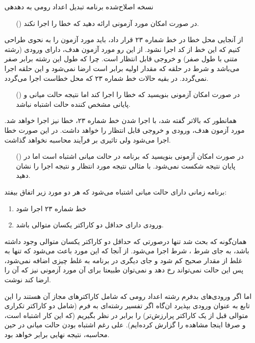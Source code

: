 \documentclass[twoside]{article}
\newenvironment{answer}{}{\medskip}
\newenvironment{qitem}[1]{%
	\begin{enumerate}\item[(\lr{#1})]}{\end{enumerate}}
\begin{document}
\begin{listing}[h]
\caption{نسخه اصلاح‌شده برنامه تبدیل اعداد رومی به دهدهی}
\label{code:convert}
\end{listing}
\begin{qitem}{b}
در صورت امکان مورد آزمونی ارائه دهید که خطا را اجرا نکند.
\end{qitem}
\begin{answer}
از آنجایی محل خطا در خط شماره ۲۳ قرار داد، باید مورد آزمون را به نحوی طراحی کنیم که این خط از کد اجرا نشود. از این رو مورد آزمون هدف، دارای ورودی  (رشته متنی با طول صفر) و خروجی قابل انتظار  است. چرا که طول این رشته برابر صفر می‌باشد و شرط  در حلقه  که مقدار اولیه  برابر  است ارضا نمی‌شود و این حلقه اجرا نمی‌گردد.
در بقیه حالات خط شماره ۲۳ که محل خطاست اجرا می‌گردد.
\end{answer}
\begin{qitem}{c}
در صورت امکان آزمونی بنویسید که خطا را اجرا کند اما نتیجه حالت میانی و پایانی مشخص کننده حالت اشتباه نباشد.
\end{qitem}
\begin{answer}
همانطور که بالاتر گفته شد، با اجرا شدن خط شماره ۲۳، خطا نیز اجرا خواهد شد. مورد آزمون هدف، ورودی  و خروجی قابل انتظار  را خواهد داشت. در این صورت خطا اجرا می‌شود ولی تاثیری بر فرآیند محاسبه نخواهد گذاشت.
\end{answer}
\begin{qitem}{d}
در صورت امکان آزمونی بنویسید که برنامه در حالت میانی اشتباه است اما در پایان نتیجه شکست نمی‌شود. با مثالی نتیجه مورد انتظار و نتیجه اجرا را نشان دهید.
\end{qitem}
\begin{answer}
برنامه زمانی دارای حالت میانی اشتباه می‌شود که هر دو مورد زیر اتفاق بیفتد:
\begin{enumerate}
	\item خط شماره ۲۳ اجرا شود
	\item ورودی دارای حداقل دو کاراکتر یکسان متوالی باشد.
\end{enumerate}

همان‌گونه که بحث شد تنها درصورتی که حداقل دو کاراکتر یکسان متوالی وجود داشته باشد، به جای شرط ، شرط  اجرا می‌شود. از آنجا که این مورد باعث می‌شود که تنها به غلط از مقدار صحیح کم شود و جای دیگری در برنامه به غلط چیزی اضافه نمی‌شود، پس این حالت نمی‌تواند رخ دهد و نمی‌توان طبیعتا برای آن مورد آزمونی نیز که آن را ارضا کند نوشت.

اما اگر ورودی‌های بدفرم رشته اعداد رومی که شامل کاراکترهای مجاز آن هستند را این تابع به عنوان ورودی بپذیرد ان‌گاه اگر تفسیر رشته‌ای به فرم  (شامل دو کاراکتر تکراری متوالی قبل از یک کاراکتر پرارزش‌تر) را برابر  در نظر بگیریم (که این کار اشتباه است، و صرفا اینجا مشاهده را گزارش کرده‌ایم). علی رغم اشتباه بودن حالت میانی در حین محاسبه، نتیجه نهایی برابر  خواهد بود.
\end{answer}
\end{document}
